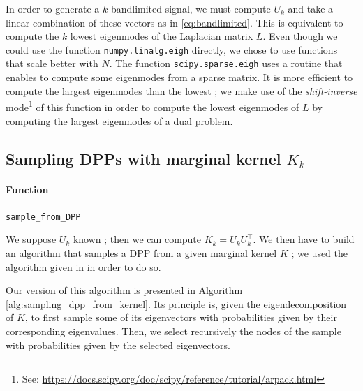 \documentclass{article}
\begin{document}
In order to generate a $k$-bandlimited signal, we must compute $U_k$ and take a linear combination of these vectors as in \eqref{eq:bandlimited}. This is equivalent to compute the $k$ lowest eigenmodes of the Laplacian matrix $L$. Even though we could use the function \verb#numpy.linalg.eigh# directly, we chose to use functions that scale better with $N$. The function \verb#scipy.sparse.eigh# uses a routine that enables to compute some eigenmodes from a sparse matrix. It is more efficient to compute the largest eigenmodes than the lowest ; we make use of the \emph{shift-inverse} mode\footnote{See: \url{https://docs.scipy.org/doc/scipy/reference/tutorial/arpack.html}} of this function in order to compute the lowest eigenmodes of $L$ by computing the largest eigenmodes of a dual problem.


\subsection[Sampling DPPs with marginal kernel Kk]{Sampling DPPs with marginal kernel $K_k$}


\paragraph{Function} \verb#sample_from_DPP#


We suppose $U_k$ known ; then we can compute $K_k = U_k U_k^\top$. We then have to build an algorithm that samples a DPP from a given marginal kernel $K$ ; we used the algorithm given in \cite{tremblay2017, kuelsza2012} in order to do so. 


Our version of this algorithm is presented in Algorithm \ref{alg:sampling_dpp_from_kernel}. Its principle is, given the eigendecomposition of $K$, to first sample some of its eigenvectors with probabilities given by their corresponding eigenvalues. Then, we select recursively the nodes of the sample with probabilities given by the selected eigenvectors.
\end{document}
